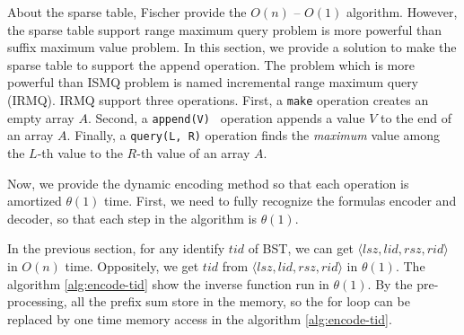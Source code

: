 About the sparse table, Fischer provide the $O(n)$ -- $O(1)$
algorithm.  However, the sparse table support range maximum query
problem is more powerful than suffix maximum value problem.  In this
section, we provide a solution to make the sparse table to support the
append operation. The problem which is more powerful than ISMQ problem
is named incremental range maximum query (IRMQ).  IRMQ support three
operations.  First, a {\tt make} operation creates an empty array $A$.
Second, a {\tt append(V) } operation appends a value $V$ to the end of
an array $A$.  Finally, a {\tt query(L, R)} operation finds the {\em
  maximum} value among the $L$-th value to the $R$-th value of an
array $A$.

\iffalse

ISMQ 已知解法有二，其一使用並查集在 $O(\alpha(n))$ 解決單一操作，其二
使用樸素的稀疏表在 $O(\log n)$完成插入操作、$O(1)$ 完成詢問操作。其二，
Fischer \cite{fischer} 提出的 $\theta(n)$ -- $\theta(1)$ 無法應用在此，
其原因在於插入元素時，無法動態決定 in-block 的最大值，必須等到整個
in-block 塞滿至預設值才可解決。

在我們的應用中維護後綴最大值，
拓展其操作成為增長區間最大值查找 (\emph{incremental range maximum query}, IRMQ)，
其支援兩項操作：
\fi

Now, we provide the dynamic encoding method so that each operation is
amortized $\theta(1)$ time.  First, we need to fully recognize the
formulas encoder and decoder, so that each step in the algorithm is
$\theta(1)$.

In the previous section, for any identify $\mathit{tid}$ of BST, we
can get $\langle\mathit{lsz}, \mathit{lid}, \mathit{rsz},
\mathit{rid}\rangle$ in $O(n)$ time.  Oppositely, we get
$\mathit{tid}$ from $\langle\mathit{lsz}, \mathit{lid}, \mathit{rsz},
\mathit{rid}\rangle$ in $\theta(1)$.  The algorithm
\ref{alg:encode-tid} show the inverse function run in $\theta(1)$.  By
the pre-processing, all the prefix sum store in the memory, so the for
loop can be replaced by one time memory access in the algorithm
\ref{alg:encode-tid}.

\iffalse
接下來的幾段中，我們提供動態的編碼方式使得每一操作皆均攤 $\theta(1)$ 完成。首先，我們需要充分認知編碼相互轉換的公式，藉以在算法中完成每一步皆為 $\theta(1)$ 的要求。

在上一節提出對於任意編號 $\mathit{tid}$ 可以在 $O(n)$ 時間內得到 $\langle\mathit{lsz},\mathit{lid},\mathit{rsz},\mathit{rid}\rangle$；
相反地，可以在 $\theta(1)$ 時間內逆推得到 $\mathit{tid}$，如算法 ~\ref{alg:encode-tid}。
透過預處理，事先將所有前綴和保存下來，在算法中的迴圈可視為一次內存存取，使得時間複雜度 $\theta(1)$。
\fi

